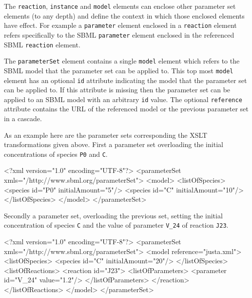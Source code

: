 \documentclass[10pt,twocolumntoc]{cekarticle}
\begin{document}
The \texttt{reaction}, \texttt{instance} and \texttt{model} elements can enclose other
parameter set elements (to any depth) and define the context in which those enclosed
elements have effect. For example a \texttt{parameter} element enclosed in a
\texttt{reaction} element refers specifically to the SBML \texttt{parameter} element
enclosed in the referenced SBML \texttt{reaction} element.  

The \texttt{parameterSet} element contains a single \texttt{model} element which refers to
the SBML model that the parameter set can be applied to.  This top most \texttt{model}
element has an optional \texttt{id} attribute indicating the model that the parameter set can
be applied to. If this attribute is missing then the parameter set can be applied to an SBML
model with an arbitrary \texttt{id} value. The optional \texttt{reference} attribute contains
the URL of the referenced model or the previous parameter set in a cascade.

As an example here are the parameter sets corresponding the XSLT transformations given above.
First a parameter set overloading the initial concentrations of species \texttt{P0} and \texttt{C}.

\begin{example}
<?xml version="1.0" encoding="UTF-8"?>
<parameterSet xmls="/http://www.sbml.org/parameterSet">
  <model>
    <listOfSpecies>
      <species id="P0" initialAmount="5"/>
      <species id="C" initialAmount="10"/>
    </listOfSpecies>
  </model>
</parameterSet>
\end{example}

Secondly a parameter set, overloading the previous set, setting the initial concentration of species
\texttt{C} and the value of parameter \texttt{V\_24} of reaction \texttt{J23}.

\begin{example}
<?xml version="1.0" encoding="UTF-8"?>
<parameterSet xmls="/http://www.sbml.org/parameterSet">
  <model reference="justa.xml">
    <listOfSpecies>
      <species id="C" initialAmount="20"/>
    </listOfSpecies>
    <listOfReactions>
      <reaction id="J23">
        <listOfParameters>
          <parameter id="V_24" value="1.2"/>
        </listOfParameters>
      </reaction>
    </listOfReactions>
  </model>
</parameterSet>
\end{example}
\end{document}

